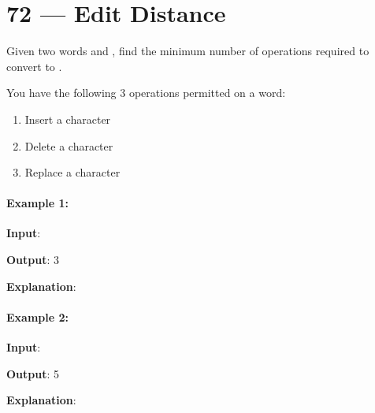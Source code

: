 \section{72 --- Edit Distance}
Given two words  and , find the minimum number of operations required to convert  to .

You have the following 3 operations permitted on a word:

\begin{enumerate}
\item Insert a character
\item Delete a character
\item Replace a character
\end{enumerate}

\paragraph{Example 1:}
\begin{flushleft}


\textbf{Input}: 

\textbf{Output}: 3

\textbf{Explanation}: 



\end{flushleft}

\paragraph{Example 2:}
\begin{flushleft}


\textbf{Input}: 

\textbf{Output}: 5

\textbf{Explanation}: 






\end{flushleft}

